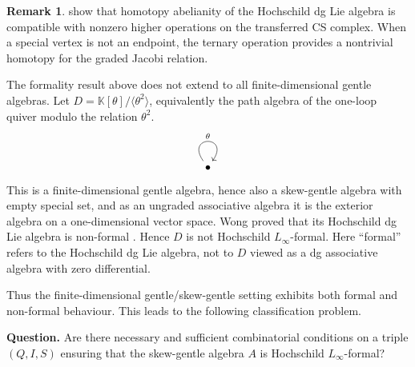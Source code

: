 \documentclass[11pt,a4paper,reqno]{amsart}
\newcommand{\mK}{\mathbb K}
\theoremstyle{plain}
\theoremstyle{definition}
\newtheorem{remark}[remark]{Remark}
\numberwithin{equation}{section}
\begin{document}
\begin{remark}
	 show that homotopy
	abelianity of the Hochschild dg Lie algebra is compatible with
	nonzero higher operations on the transferred CS complex. When a
	special vertex is not an endpoint, the ternary operation provides
	a nontrivial homotopy for the graded Jacobi relation.
\end{remark}
	
	The formality result above does not extend to all finite-dimensional gentle
	algebras.  Let $D=\mK[\theta]/\langle \theta^2 \rangle$, equivalently the path algebra of the
	one-loop quiver modulo the relation $\theta^2$.  
	\[\begin{tikzcd}
		\bullet
		\arrow["\theta", from=1-1, to=1-1, loop, in=55, out=125, distance=10mm]
	\end{tikzcd}\]
	This is a finite-dimensional
	gentle algebra, hence also a skew-gentle algebra with empty special set, and as
	an ungraded associative algebra it is the exterior algebra on a
	one-dimensional vector space.  Wong proved that its Hochschild dg Lie algebra
	is non-formal \cite[Theorem~6.3]{Won17}.  Hence $D$ is not Hochschild $L_\infty$-formal.
	Here ``formal'' refers to the Hochschild dg Lie algebra, not to $D$ viewed as a
	dg associative algebra with zero differential.
	
	Thus the finite-dimensional gentle/skew-gentle setting exhibits both formal
	and non-formal behaviour. This leads to the following classification problem.

\medskip
\noindent
\textbf{Question.}
Are there necessary and sufficient combinatorial conditions on a triple
$(Q,I,S)$ ensuring that the skew-gentle algebra $A$ is Hochschild
$L_\infty$-formal?
	
	\clearpage
	
	\appendix
	\providecommand{\FigCell}[1]{%
		\begin{minipage}[t]{\linewidth}
			\vspace{0pt}
			\centering
			#1
	\end{minipage}}
	
	\providecommand{\CondCell}[1]{%
		\begin{minipage}[t]{\linewidth}
			\vspace{0pt}
			\raggedright
			#1
	\end{minipage}}
	
\end{document}
